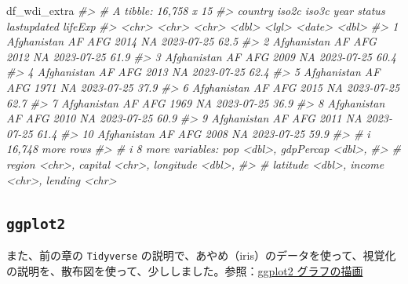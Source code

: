 \documentclass[
  xelatex, ja=standard]{bxjsbook}
\newenvironment{Shaded}{\begin{snugshade}}{\end{snugshade}}
\newcommand{\CommentTok}[1]{\textcolor[rgb]{0.56,0.35,0.01}{\textit{#1}}}
\newcommand{\NormalTok}[1]{#1}
\theoremstyle{definition}
\theoremstyle{definition}
\theoremstyle{definition}
\theoremstyle{definition}
\theoremstyle{remark}
\begin{document}
\begin{Shaded}
\begin{Highlighting}[]
\NormalTok{df\_wdi\_extra}
\CommentTok{\#\textgreater{} \# A tibble: 16,758 x 15}
\CommentTok{\#\textgreater{}    country     iso2c iso3c  year status lastupdated lifeExp}
\CommentTok{\#\textgreater{}    \textless{}chr\textgreater{}       \textless{}chr\textgreater{} \textless{}chr\textgreater{} \textless{}dbl\textgreater{} \textless{}lgl\textgreater{}  \textless{}date\textgreater{}        \textless{}dbl\textgreater{}}
\CommentTok{\#\textgreater{}  1 Afghanistan AF    AFG    2014 NA     2023{-}07{-}25     62.5}
\CommentTok{\#\textgreater{}  2 Afghanistan AF    AFG    2012 NA     2023{-}07{-}25     61.9}
\CommentTok{\#\textgreater{}  3 Afghanistan AF    AFG    2009 NA     2023{-}07{-}25     60.4}
\CommentTok{\#\textgreater{}  4 Afghanistan AF    AFG    2013 NA     2023{-}07{-}25     62.4}
\CommentTok{\#\textgreater{}  5 Afghanistan AF    AFG    1971 NA     2023{-}07{-}25     37.9}
\CommentTok{\#\textgreater{}  6 Afghanistan AF    AFG    2015 NA     2023{-}07{-}25     62.7}
\CommentTok{\#\textgreater{}  7 Afghanistan AF    AFG    1969 NA     2023{-}07{-}25     36.9}
\CommentTok{\#\textgreater{}  8 Afghanistan AF    AFG    2010 NA     2023{-}07{-}25     60.9}
\CommentTok{\#\textgreater{}  9 Afghanistan AF    AFG    2011 NA     2023{-}07{-}25     61.4}
\CommentTok{\#\textgreater{} 10 Afghanistan AF    AFG    2008 NA     2023{-}07{-}25     59.9}
\CommentTok{\#\textgreater{} \# i 16,748 more rows}
\CommentTok{\#\textgreater{} \# i 8 more variables: pop \textless{}dbl\textgreater{}, gdpPercap \textless{}dbl\textgreater{},}
\CommentTok{\#\textgreater{} \#   region \textless{}chr\textgreater{}, capital \textless{}chr\textgreater{}, longitude \textless{}dbl\textgreater{},}
\CommentTok{\#\textgreater{} \#   latitude \textless{}dbl\textgreater{}, income \textless{}chr\textgreater{}, lending \textless{}chr\textgreater{}}
\end{Highlighting}
\end{Shaded}

\hypertarget{ggplot2}{%
\subsection{\texorpdfstring{\texttt{ggplot2}}{ggplot2}}\label{ggplot2}}

また、前の章の \texttt{Tidyverse} の説明で、あやめ（iris）のデータを使って、視覚化の説明を、散布図を使って、少ししました。参照：\href{https://icu-hsuzuki.github.io/ds4aj/tidyverse.html\#ggplot2-グラフの描画}{ggplot2 グラフの描画}
\end{document}
